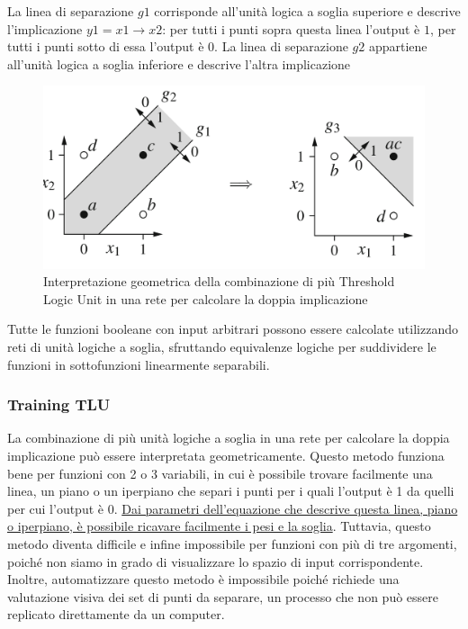 La linea di separazione $g1$ corrisponde all'unità logica a soglia superiore e descrive l'implicazione $y1 = x1 \rightarrow x2$: per tutti i punti sopra questa linea l'output è $1$, per tutti i punti sotto di essa l'output è $0$. La linea di separazione $g2$ appartiene all'unità logica a soglia inferiore e descrive l'altra implicazione

\begin{figure}[h]
    \centering
    \includegraphics[scale=0.4]{images/geometric-tlu-bi-implication.png}
    \caption{Interpretazione geometrica della combinazione di più Threshold Logic Unit in una rete per calcolare la doppia implicazione}
\end{figure}

Tutte le funzioni booleane con input arbitrari possono essere calcolate utilizzando reti di unità logiche a soglia, sfruttando equivalenze logiche per suddividere le funzioni in sottofunzioni linearmente separabili.

\subsubsection{Training TLU}
La combinazione di più unità logiche a soglia in una rete per calcolare la doppia implicazione può essere interpretata geometricamente. Questo metodo funziona bene per funzioni con 2 o 3 variabili, in cui è possibile trovare facilmente una linea, un piano o un iperpiano che separi i punti per i quali l'output è 1 da quelli per cui l'output è 0. \uline{Dai parametri dell'equazione che descrive questa linea, piano o iperpiano, è possibile ricavare facilmente i pesi e la soglia}. Tuttavia, questo metodo diventa difficile e infine impossibile per funzioni con più di tre argomenti, poiché non siamo in grado di visualizzare lo spazio di input corrispondente. Inoltre, automatizzare questo metodo è impossibile poiché richiede una valutazione visiva dei set di punti da separare, un processo che non può essere replicato direttamente da un computer.

